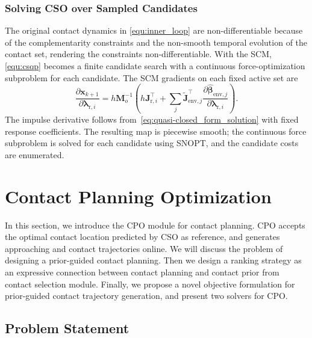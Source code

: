 \subsubsection{Solving CSO over Sampled Candidates}
The original contact dynamics in \eqref{equ:inner_loop} are non-differentiable because of the complementarity constraints and the non-smooth temporal evolution of the contact set, rendering the constraints non-differentiable. With the SCM, \eqref{equ:csqp} becomes a finite candidate search with a continuous force-optimization subproblem for each candidate. The SCM gradients on each fixed active set are
\begin{equation}
\frac{\partial\boldsymbol{x}_{k+1}}{\partial\boldsymbol{\lambda}_{\mathrm r,i}}
=h\boldsymbol{M}_o^{-1}\!\left(
 h\boldsymbol{J}_{\mathrm r,i}^\top+
 \sum_j\boldsymbol{\tilde J}_{\mathrm{env},j}^\top
 \frac{\partial\hat{\boldsymbol{\beta}}_{\mathrm{env},j}}
 {\partial\boldsymbol{\lambda}_{\mathrm r,i}}\right).
\end{equation}
The impulse derivative follows from~\eqref{eq:quasi-closed_form_solution} with fixed response coefficients. The resulting map is piecewise smooth; the continuous force subproblem is solved for each candidate using SNOPT, and the candidate costs are enumerated.

\section{Contact Planning Optimization}\label{sec:cpo}

In this section, we introduce the CPO module for contact planning. CPO accepts the optimal contact location predicted by CSO as reference, and generates approaching and contact trajectories online. We will discuss the problem of designing a prior-guided contact planning. Then we design a ranking strategy as an expressive connection between contact planning and contact prior from contact selection module. Finally, we propose a novel objective formulation for prior-guided contact trajectory generation, and present two solvers for CPO.

\subsection{Problem Statement}

